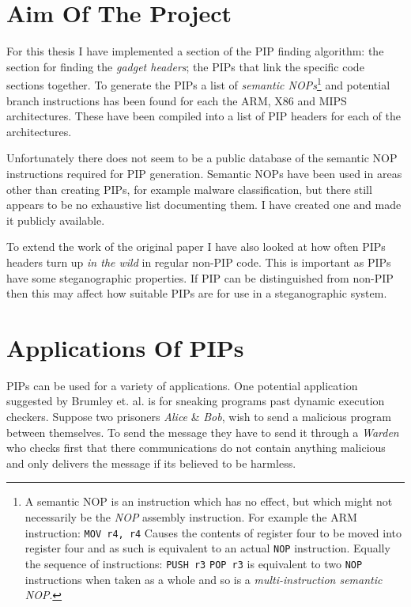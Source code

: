 \documentclass[10pt,]{book}
\begin{document}
\section{Aim Of The Project}

For this thesis I have implemented a section of the PIP finding
algorithm: the section for finding the \emph{gadget headers}; the PIPs
that link the specific code sections together. To generate the PIPs a
list of \emph{semantic NOPs}\footnote{A semantic NOP is an instruction
  which has no effect, but which might not necessarily be the \emph{NOP}
  assembly instruction. For example the ARM instruction:
  \lstinline!MOV r4, r4! Causes the contents of register four to be
  moved into register four and as such is equivalent to an actual
  \lstinline!NOP! instruction. Equally the sequence of instructions:
  \lstinline!PUSH r3! \lstinline!POP r3! is equivalent to two
  \lstinline!NOP! instructions when taken as a whole and so is a
  \emph{multi-instruction semantic NOP}.} and potential branch
instructions has been found for each the ARM, X86 and MIPS
architectures. These have been compiled into a list of PIP headers for
each of the architectures.

Unfortunately there does not seem to be a public database of the
semantic NOP instructions required for PIP generation. Semantic NOPs
have been used in areas other than creating PIPs, for example malware
classification\autocite{Bilar:2007uu}\autocite{Preda:2007ky}, but there
still appears to be no exhaustive list documenting them. I have created
one and made it publicly available.

To extend the work of the original paper\autocite{Cha:2010uh} I have
also looked at how often PIPs headers turn up \emph{in the wild} in
regular non-PIP code. This is important as PIPs have some steganographic
properties. If PIP can be distinguished from non-PIP then this may
affect how suitable PIPs are for use in a steganographic system.

\section{Applications Of PIPs}

PIPs can be used for a variety of applications. One potential
application suggested by Brumley et. al.\autocite{Cha:2010uh} is for
sneaking programs past dynamic execution checkers. Suppose two prisoners
\emph{Alice} \& \emph{Bob}, wish to send a malicious program between
themselves. To send the message they have to send it through a
\emph{Warden} who checks first that there communications do not contain
anything malicious and only delivers the message if its believed to be
harmless.
\end{document}
